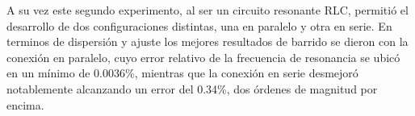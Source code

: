 A su vez este segundo experimento, al ser un circuito resonante RLC, permitió el desarrollo de dos configuraciones distintas, una en paralelo y otra en serie. En terminos de dispersión y ajuste los mejores resultados de barrido se dieron con la conexión en paralelo, cuyo error relativo de la frecuencia de resonancia se ubicó en un mínimo de 0.0036\%, mientras que la conexión en serie desmejoró notablemente alcanzando un error del 0.34\%, dos órdenes de magnitud por encima. 


